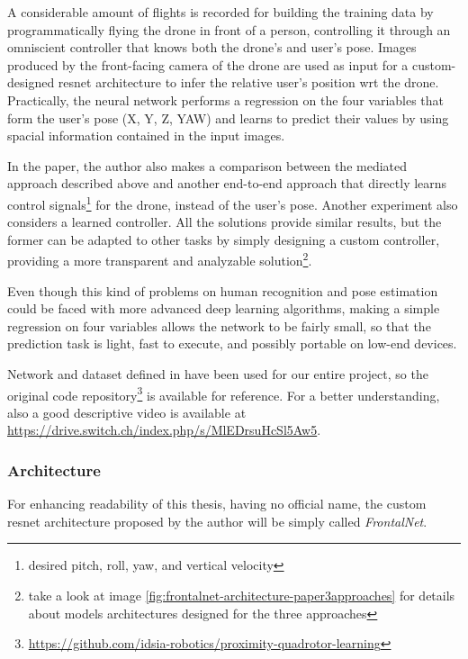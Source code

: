 A considerable amount of flights is recorded for building the training data by programmatically flying the drone in front of a person, controlling it through an omniscient controller that knows both the drone's and user's pose. Images produced by the front-facing camera of the drone are used as input for a custom-designed \gls{resnet} architecture to infer the relative user's position \gls{wrt} the drone. Practically, the neural network performs a regression on the four variables that form the user's pose (X, Y, Z, YAW) and learns to predict their values by using spacial information contained in the input images. 

In the paper, the author also makes a comparison between the mediated approach described above and another end-to-end approach that directly learns control signals\footnote{desired pitch, roll, yaw, and vertical velocity} for the drone, instead of the user's pose. Another experiment also considers a learned controller. All the solutions provide similar results, but the former can be adapted to other tasks by simply designing a custom controller, providing a more transparent and analyzable solution\footnote{take a look at image \ref{fig:frontalnet-architecture-paper3approaches} for details about models architectures designed for the three approaches}.

Even though this kind of problems on human recognition and pose estimation could be faced with more advanced deep learning algorithms, making a simple regression on four variables allows the network to be fairly small, so that the prediction task is light, fast to execute, and possibly portable on low-end devices.

\medskip

Network and dataset defined in \cite{mantegazza2019visionbased} have been used for our entire project, so the original code repository\footnote{\url{https://github.com/idsia-robotics/proximity-quadrotor-learning}} is available for reference. For a better understanding, also a good descriptive video is available at \url{https://drive.switch.ch/index.php/s/MlEDrsuHcSl5Aw5}.


\subsubsection{Architecture}
\label{subsec:frontalnet-architecture}

For enhancing readability of this thesis, having no official name, the custom \gls{resnet} architecture proposed by the author will be simply called \textit{FrontalNet}. 

